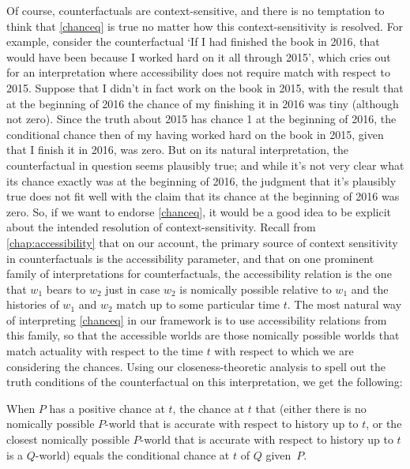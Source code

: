 \documentclass[If.tex]{subfiles}
\begin{document}
Of course, counterfactuals are context-sensitive, and there is no temptation to think that \ref{chanceq} is true no matter how this context-sensitivity is resolved. For example, consider the counterfactual ‘If I had finished the book in 2016, that would have been because I worked hard on it all through 2015’, which cries out for an interpretation where accessibility does not require match with respect to 2015. Suppose that I didn't in fact work on the book in 2015, with the result that at the beginning of 2016 the chance of my finishing it in 2016 was tiny (although not zero). Since the truth about 2015 has chance 1 at the beginning of 2016, the conditional chance then of my having worked hard on the book in 2015, given that I finish it in 2016, was zero. But on its natural interpretation, the counterfactual in question seems plausibly true; and while it's not very clear what its chance exactly was at the beginning of 2016, the judgment that it's plausibly true does not fit well with the claim that its chance at the beginning of 2016 was zero.  So, if we want to endorse \ref{chanceq}, it would be a good idea to be explicit about the intended resolution of context-sensitivity.  Recall from \autoref{chap:accessibility} that on our account, the primary source of context sensitivity in counterfactuals is the accessibility parameter, and that on one prominent family of interpretations for counterfactuals, the accessibility relation is the one that $w_1$ bears to $w_2$ just in case $w_2$ is nomically possible relative to $w_1$ and the histories of $w_1$ and $w_2$ match up to some particular time $t$.  The most natural way of interpreting \ref{chanceq} in our framework is to use accessibility relations from this family, so that the accessible worlds are those nomically possible worlds that match actuality with respect to the time $t$ with respect to which we are considering the chances.  Using our closeness-theoretic analysis to spell out the truth conditions of the counterfactual on this interpretation, we get the following:
\begin{prop}
	\item
	When $P$ has a positive chance at $t$, the chance at $t$ that (either there is no nomically possible $P$-world that is accurate with respect to history up to $t$, or the closest nomically possible $P$-world that is accurate with respect to history up to $t$ is a $Q$-world) equals the conditional chance at $t$ of $Q$ given~$P$.	
\end{prop}
\end{document}
